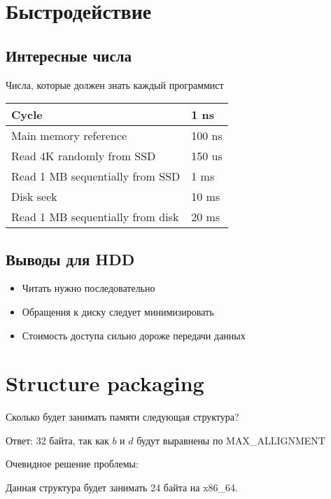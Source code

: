 \documentclass[../lectures.tex]{subfiles}
\begin{document}
\section{Быстродействие}
\subsection{Интересные числа}
\begin{center}
Числа, которые должен знать каждый программист
\begin{tabular}{| l | l |}
    \hline
    Cycle                            & 1   ns \\ \hline
    Main memory reference            & 100 ns \\ \hline
    Read 4K randomly from SSD        & 150 us \\ \hline
    Read 1 MB sequentially from SSD  & 1   ms \\ \hline
    Disk seek                        & 10  ms \\ \hline
    Read 1 MB sequentially from disk & 20  ms \\ \hline
\end{tabular}
\end{center}
\subsection{Выводы для HDD}
\begin{itemize}
    \item Читать нужно последовательно
    \item Обращения к диску следует минимизировать
    \item Стоимость доступа сильно дороже передачи данных
\end{itemize}

\section{Structure packaging}
Сколько будет занимать памяти следующая структура?


Ответ: 32 байта, так как $b$ и $d$ будут выравнены по MAX\_ALLIGNMENT

Очевидное решение проблемы:


Данная структура будет занимать 24 байта на x86\_64.
\end{document}
